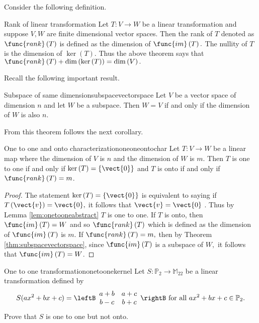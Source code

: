 Consider the following definition. 

\begin{definition}{Rank of linear transformation}{}
Let $T:V\rightarrow W$ be a linear transformation and suppose $V,W$ are finite dimensional vector spaces. Then
the rank of $T$ denoted as $\func{rank}\left( T\right) $ is defined as the
dimension of $\func{im}\left( T\right) .$ The nullity of $T$ is the
dimension of $\ker \left( T\right) .$ Thus the above theorem says that $
\func{rank}\left( T\right) +\dim \left( \ker \left( T\right) \right) =\dim
\left( V\right) .$
\end{definition}

Recall the following important result. 

\begin{theorem}{Subspace of same dimension}{subspacevectorspace}
Let $V$ be a vector space of dimension $n$ and let $W$ be a
subspace. Then $W=V$ if and only if the dimension of $W$ is also $n$.
\end{theorem}

From this theorem follows the next corollary.

\begin{corollary}{One to one and onto characterization}{oneoneontochar}
Let $T:V\rightarrow W$ be a linear map where the dimension of $V$ is $n$ and
the dimension of $W$ is $m$. Then $T$ is one to one if and only if $\ker
\left( T\right) =\left\{ \vect{0}\right\} $ and $T$ is onto if and only if $
\func{rank}\left( T\right) =m$.
\end{corollary}

\begin{proof}
The statement $\ker \left( T \right) =\left\{ \vect{0}\right\} $
is equivalent to saying if $T \left( \vect{v} \right)=\vect{0},$ it follows that $\vect{v}=\vect{0}$
. Thus by Lemma \ref{lem:onetooneabstract} $T$ is one to one. If $T$ is onto, then $
\func{im}\left( T\right) =W$ and so $\func{rank}\left( T\right) $ which is
defined as the dimension of $\func{im}\left( T\right) $ is $m$. If $\func{
rank}\left( T\right) =m,$ then by Theorem \ref{thm:subspacevectorspace}, since $\func{im}
\left( T\right) $ is a subspace of $W,$ it follows that $\func{im}\left(
T\right) =W$. 
\end{proof}

\begin{example}{One to one transformation}{onetoonekernel}
Let $S:\mathbb{P}_2\to\mathbb{M}_{22}$ be a linear transformation
defined by
\[ S(ax^2+bx+c)
=
\leftB\begin{array}{cc}
a+b & a+c \\ b-c & b+c \end{array}\rightB
\mbox{ for all }
 ax^2+bx+c\in \mathbb{P}_2.\]
Prove that $S$ is one to one but not onto.
\end{example}

